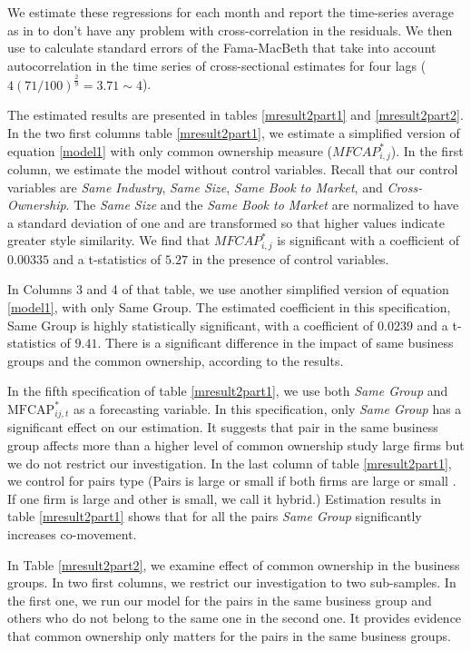 	We estimate these regressions for each month and report the time-series average as in \cite{FamaMacBeth} to don't have any problem with cross-correlation in the residuals. We then use  \cite{newey1987hypothesis} to calculate standard errors of the Fama-MacBeth that take into account autocorrelation in the time series of cross-sectional estimates for four lags ($ 4(71/100)^{\frac{2}{9}} = 3.71 \sim 4 $).
	
	The estimated results are presented in tables \ref{mresult2part1}
	and \ref{mresult2part2}.
	In the two first columns table \ref{mresult2part1}, we estimate a simplified version of equation \ref{model1} with only common ownership measure ($ MFCAP^*_{i,j}$). In the first column, we estimate the model without control variables. Recall that our control variables are \textit{Same Industry}, \textit{Same Size}, \textit{Same Book to Market}, and \textit{Cross-Ownership}. The \textit{Same Size} and the \textit{Same Book to Market} are normalized to have a standard deviation of one and are transformed so that higher values indicate greater style similarity.  We find that $ MFCAP^*_{i,j}$ is significant with a coefficient of $0.00335$ and a t-statistics of $5.27$ in the presence of control variables. 
	
	
	In Columns 3 and 4 of that table, we use another simplified version of equation \ref{model1}, with only Same Group. The estimated coefficient in this specification, Same Group is highly statistically significant, with a coefficient of   $0.0239$ and a t-statistics of $9.41$. 
	There is a significant difference in the impact of same business groups and the common ownership, according to the results. 
	
	In the fifth specification of table \ref{mresult2part1}, we use both \textit{Same Group}  and $\text{MFCAP}^*_{ij,t}$ as a forecasting variable. In this specification, only  \textit{Same Group} has a significant effect on our estimation. It suggests that pair in the same business group affects more than a higher level of common ownership
	\cite{AntonPolk} study large firms but we do not restrict  our investigation. In the last column of table \ref{mresult2part1}, we control for pairs type (Pairs is large or small if both firms are large or  small . If one firm is large and other is small, we call it hybrid.) Estimation results in table \ref{mresult2part1} shows that for all the pairs \textit{Same Group} significantly increases co-movement.
	
	In Table  \ref{mresult2part2}, we examine effect of common ownership in the business groups. In two first columns, we restrict our investigation to two sub-samples. In the first one, we run our model for the pairs in the same business group and others who do not belong to the same one in the second one. It provides evidence that common ownership only matters for the pairs in the same business groups. 
	
